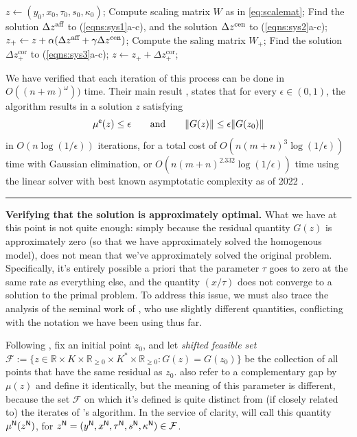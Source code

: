 \begin{subappendices}
\begin{lproof}
    \begin{algorithmic}
        \STATE $z \gets (y_0, x_0, \tau_0, s_0, \kappa_0)$;
        \WHILE{}
            \STATE Compute scaling matrix $W$ as in \eqref{eq:scalemat};
            \STATE Find the solution $\Delta {z}^{\text{aff}}$ to (\ref{eqns:sys1}a-c),
                and the solution $\Delta {z}^{\text{cen}}$ to (\ref{eqns:sys2}a-c);
            \STATE $z_+ \gets z + \alpha (\Delta {z}^{\text{aff}} + \gamma \Delta {z}^{\text{cen}})$;
            \STATE Compute the saling matrix $W_+$;
            \STATE Find the solution $\Delta z^{\text{cor}}_+$ to (\ref{eqns:sys3}a-c);
            \STATE $z \gets z_+ + \Delta z_+^{\text{cor}}$;
        \ENDWHILE
    \end{algorithmic}

    We have verified that each iteration of this process can be done in $O((n+m)^\omega))$ time.
    Their main result \parencite[Theorem 3]{badenbroek2021algorithm}, states that for every $\epsilon \in (0,1)$,
    the algorithm results in a solution $z$ satisfying
    \[
        \mu^{\sf e}(z)
        \le \epsilon
        \qquad \text{and}\qquad
        \Vert G(z) \Vert \le \epsilon
            \Vert G(z_0) \Vert
    \]
    in $O(n \log (1/\epsilon))$ iterations,
    for a total cost of
    $O(n (m+n)^3 \log (1/\epsilon) )$ time with Gaussian elimination, or
    $O(n (m+n)^{2.332} \log (1/\epsilon) )$ time using the linear solver with best
         known asymptotatic complexity as of 2022 \cite{duan2022faster}.

    \medskip
    \hrule

    \textbf{Verifying that the solution is approximately optimal.}
    What we have at this point is not quite enough: simply because the residual quantity $G(z)$ is approximately zero (so that we have approximately solved the homogenous model), does not mean that we've approximately solved the original problem.
    Specifically, it's entirely possible a priori that the parameter $\tau$ goes to zero at the same rate as everything else, and the quantity $(x/\tau)$ does not converge to a solution to the primal problem.
    To address this issue, we must also trace the analysis of the seminal work of \textcite{nesterov1996infeasible}, who use slightly different quantities, conflicting with the notation we have been using thus far.


    Following \textcite[pg. 231]{nesterov1996infeasible}, fix an initial point $z_0$, and let \emph{shifted feasible set}
    $\mathcal F := \{ z
        \in \mathbb R \times K \times \mathbb R_{\ge 0} \times K^* \times \mathbb R_{\ge 0}
        : G(z) = G(z_0)\}$
    be the collection of all points that have the same residual as $z_0$.
    \citeauthor*{nesterov1996infeasible} also refer to a complementary gap by $\mu(z)$ and define it identically, but the meaning of this parameter is different, because the set $\mathcal F$ on which it's defined is quite distinct from (if closely related to) the iterates of \citeauthor*{badenbroek2021algorithm}'s algorithm.
    In the service of clarity,
    will call this quantity $\mu^{\sf N}(z^{\sf N})$, for
    $z^{\sf N}
    = (y^{\sf N}, x^{\sf N}, \tau^{\sf N}, s^{\sf N}, \kappa^{\sf N})
    \in \mathcal F$.



\end{lproof}
\end{subappendices}
